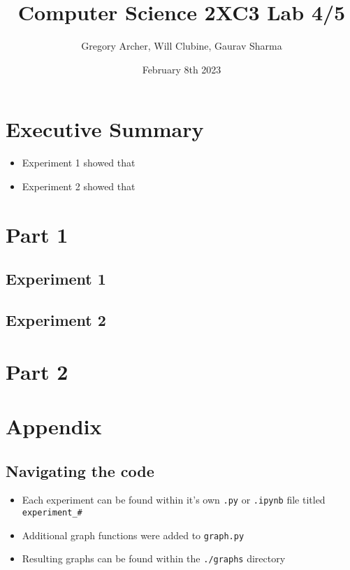 \documentclass{article}
\title{Computer Science 2XC3 Lab 4/5}
\author{Gregory Archer, Will Clubine, Gaurav Sharma}
\date{February 8th 2023}
\begin{document}
\maketitle

\newpage

\tableofcontents
\listoffigures

\newpage

\section{Executive Summary}
\begin{itemize}
    \item Experiment 1 showed that 
    \item Experiment 2 showed that 
\end{itemize}

\section{Part 1}

\subsection{Experiment 1}



\subsection{Experiment 2}



\section{Part 2}



\appendix
\section{Appendix}

\subsection{Navigating the code}

    \begin{itemize}
        \item Each experiment can be found within it's own \verb|.py| or \verb|.ipynb| file titled \verb|experiment_#|
        \item Additional graph functions were added to \verb|graph.py|
        \item Resulting graphs can be found within the \verb|./graphs| directory
    \end{itemize}
\end{document}
